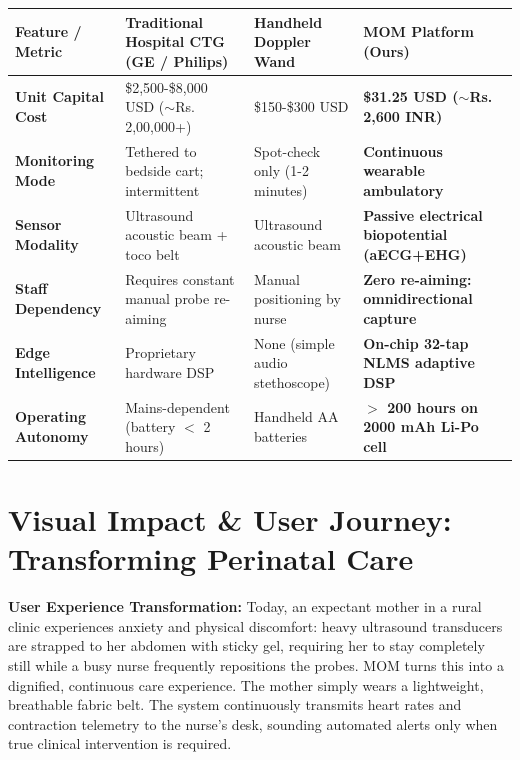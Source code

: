 \documentclass[10pt,a4paper]{article}
\begin{document}
\noindent
\begin{tabularx}{\textwidth}{lXXX}
\toprule
\textbf{Feature / Metric} & \textbf{Traditional Hospital CTG (GE / Philips)} & \textbf{Handheld Doppler Wand} & \textbf{MOM Platform (Ours)} \\
\midrule
\textbf{Unit Capital Cost} & \$2,500-\$8,000 USD ($\sim$Rs. 2,00,000+) & \$150-\$300 USD & \textbf{\$31.25 USD ($\sim$Rs. 2,600 INR)} \\
\addlinespace
\textbf{Monitoring Mode} & Tethered to bedside cart; intermittent & Spot-check only (1-2 minutes) & \textbf{Continuous wearable ambulatory} \\
\addlinespace
\textbf{Sensor Modality} & Ultrasound acoustic beam + toco belt & Ultrasound acoustic beam & \textbf{Passive electrical biopotential (aECG+EHG)} \\
\addlinespace
\textbf{Staff Dependency} & Requires constant manual probe re-aiming & Manual positioning by nurse & \textbf{Zero re-aiming: omnidirectional capture} \\
\addlinespace
\textbf{Edge Intelligence} & Proprietary hardware DSP & None (simple audio stethoscope) & \textbf{On-chip 32-tap NLMS adaptive DSP} \\
\addlinespace
\textbf{Operating Autonomy} & Mains-dependent (battery $<$ 2 hours) & Handheld AA batteries & \textbf{$>$ 200 hours on 2000 mAh Li-Po cell} \\
\bottomrule
\end{tabularx}

\clearpage

\section{Visual Impact \& User Journey: Transforming Perinatal Care}

\noindent
\textbf{User Experience Transformation:} Today, an expectant mother in a rural clinic experiences anxiety and physical discomfort: heavy ultrasound transducers are strapped to her abdomen with sticky gel, requiring her to stay completely still while a busy nurse frequently repositions the probes. MOM turns this into a dignified, continuous care experience. The mother simply wears a lightweight, breathable fabric belt. The system continuously transmits heart rates and contraction telemetry to the nurse's desk, sounding automated alerts only when true clinical intervention is required.
\end{document}
